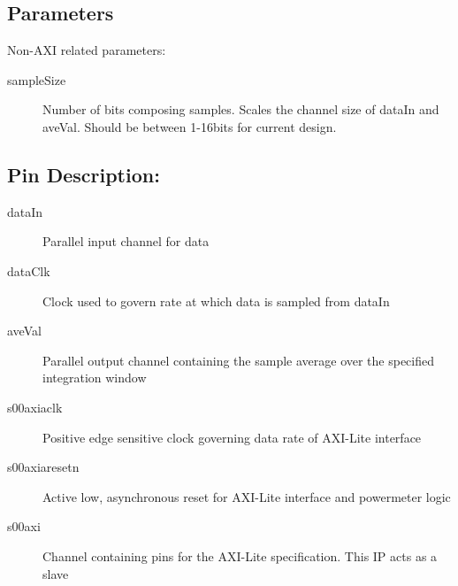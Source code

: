 \documentclass[11pt]{article}
\begin{document}
\subsection{Parameters}
Non-AXI related parameters:
\begin{description}
	\item[sampleSize]Number of bits composing samples. Scales the channel size of dataIn and aveVal. Should be between 1-16bits for current design.
\end{description}
\subsection{Pin Description:}
\begin{description}
	\item[dataIn]Parallel input channel for data
	\item[dataClk]Clock used to govern rate at which data is sampled from dataIn
	\item[aveVal]Parallel output channel containing the sample average over the specified integration window
	\item[s00\textunderscore{}axi\textunderscore{}aclk]Positive edge sensitive clock governing data rate of AXI-Lite interface
	\item[s00\textunderscore{}axi\textunderscore{}aresetn]Active low, asynchronous reset for AXI-Lite interface and power\textunderscore meter logic
	\item[s00\textunderscore{}axi]Channel containing pins for the AXI-Lite specification. This IP acts as a slave
\end{description}
\end{document}
